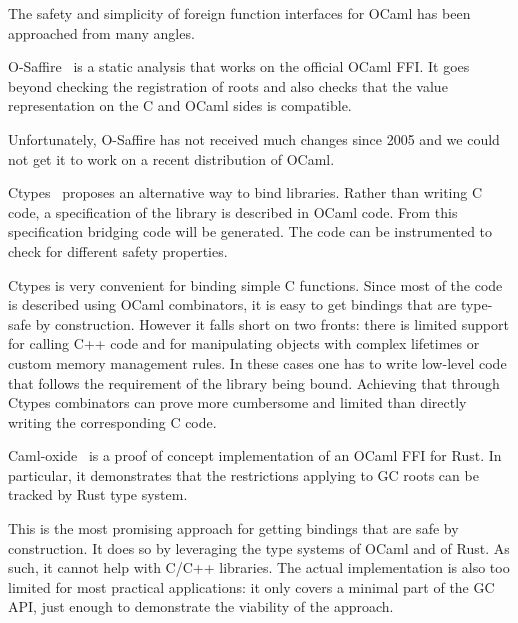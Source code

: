 \documentclass[a4paper]{easychair}
\newcommand{\cpp}[1]{\lstinline[style=C++]{#1}}
\begin{document}
The safety and simplicity of foreign function interfaces for OCaml has been
approached from many angles.

O-Saffire~\citep{Furr:2005:CTS:1064978.1065019} is a static analysis that works
on the official OCaml FFI. It goes beyond checking the registration of roots
and also checks that the value representation on the C and OCaml sides is
compatible.

Unfortunately, O-Saffire has not received much changes since 2005 and we could
not get it to work on a recent distribution of OCaml.

Ctypes~\citep{DBLP:journals/scp/YallopSM18} proposes an alternative way to bind
libraries. Rather than writing C code, a specification of the library is
described in OCaml code. From this specification bridging code will be
generated. The code can be instrumented to check for different safety
properties.

Ctypes is very convenient for binding simple C functions. Since most of the
code is described using OCaml combinators, it is easy to get bindings that are
type-safe by construction.  However it falls short on two fronts:  there is
limited support for calling C++ code and for manipulating objects with complex
lifetimes or custom memory management rules.  In these cases one has to write
low-level code that follows the requirement of the library being bound.
Achieving that through Ctypes combinators can prove more cumbersome and limited
than directly writing the corresponding C code.

Caml-oxide~\citep{camloxide} is a proof of concept implementation of an OCaml
FFI for Rust. In particular, it demonstrates that the restrictions applying to
GC roots can be tracked by Rust type system.

This is the most promising approach for getting bindings that are safe by
construction. It does so by leveraging the type systems of OCaml and of Rust.
As such, it cannot help with C/C++ libraries. The actual implementation is
also too limited for most practical applications: it only covers a minimal part
of the GC API, just enough to demonstrate the viability of the approach.

% 
% 

\label{sect:bib}

\end{document}
